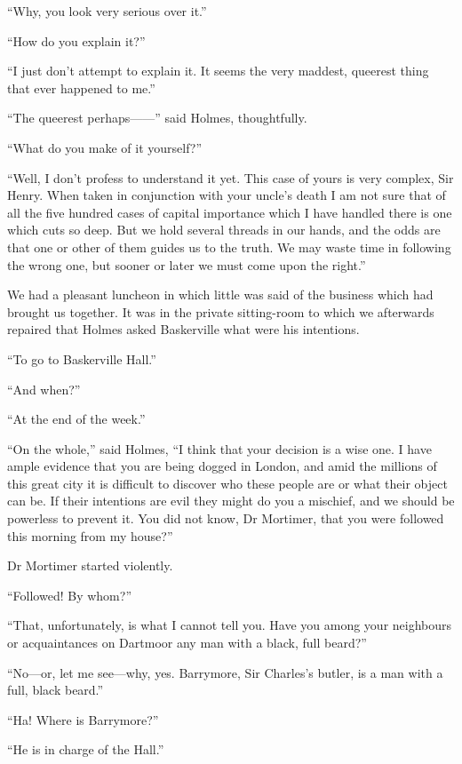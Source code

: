 \documentclass[paper=5.5in:8.5in,BCOR=7mm,twoside,DIV=calc,12pt,usegeometry,openany,chapterprefix,endperiod,headings=big]{scrbook} %
\begin{document}
\enquote{Why, you look very serious over it.}

\enquote{How do you explain it?}

\enquote{I just don't attempt to explain it. It seems the very maddest, queerest thing that ever happened to me.}

\enquote{The queerest perhaps------} said Holmes, thoughtfully.

\enquote{What do you make of it yourself?}

\enquote{Well, I don't profess to understand it yet. This case of yours is very complex, Sir Henry. When taken in conjunction with your uncle's death I am not sure that of all the five hundred cases of capital importance which I have handled there is one which cuts so deep. But we hold several threads in our hands, and the odds are that one or other of them guides us to the truth. We may waste time in following the wrong one, but sooner or later we must come upon the right.}

We had a pleasant luncheon in which little was said of the business which had brought us together. It was in the private sitting-room to which we afterwards repaired that Holmes asked Baskerville what were his intentions.

\enquote{To go to Baskerville Hall.}

\enquote{And when?}

\enquote{At the end of the week.}

\enquote{On the whole,} said Holmes, \enquote{I think that your decision is a wise one. I have ample evidence that you are being dogged in London, and amid the millions of this great city it is difficult to discover who these people are or what their object can be. If their intentions are evil they might do you a mischief, and we should be powerless to prevent it. You did not know, Dr Mortimer, that you were followed this morning from my house?}

Dr Mortimer started violently.

\enquote{Followed! By whom?}

\enquote{That, unfortunately, is what I cannot tell you. Have you among your neighbours or acquaintances on Dartmoor any man with a black, full beard?}

\enquote{No---or, let me see---why, yes. Barrymore, Sir Charles's butler, is a man with a full, black beard.}

\enquote{Ha! Where is Barrymore?}

\enquote{He is in charge of the Hall.}
\end{document}
